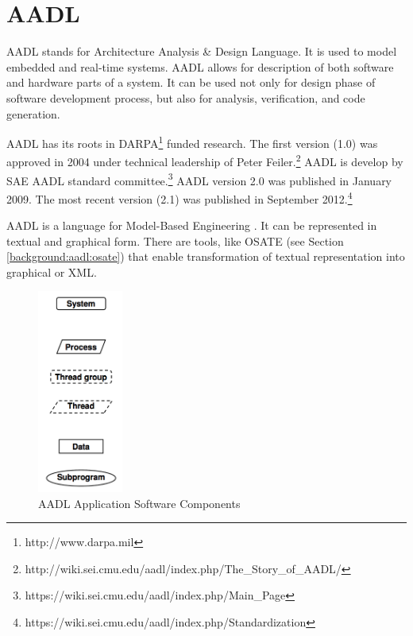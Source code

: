 \section{AADL}
\label{background:aadl}

AADL stands for Architecture Analysis \& Design Language. It is used to model embedded and real-time systems. AADL allows for description of both software and hardware parts of a system. It can be used not only for design phase of software development process, but also for analysis, verification, and code generation.

AADL has its roots in DARPA\footnote{http://www.darpa.mil} funded research. The first version (1.0) was approved in 2004 under technical leadership of Peter Feiler.\footnote{http://wiki.sei.cmu.edu/aadl/index.php/The\_Story\_of\_AADL/} AADL is develop by SAE AADL standard committee.\footnote{https://wiki.sei.cmu.edu/aadl/index.php/Main\_Page} AADL version 2.0 was published in January 2009. The most recent version (2.1) was published in September 2012.\footnote{https://wiki.sei.cmu.edu/aadl/index.php/Standardization}

AADL is a language for Model-Based Engineering \cite{AadlBook}. It can be represented in textual and graphical form. There are tools, like OSATE (see Section \ref{background:aadl:osate}) that enable transformation of textual representation into graphical or XML. 

\begin{figure}
  \begin{center}
    \includegraphics[width=0.25\textwidth]{figures/aadl-app-components.png}
  \end{center}
  \caption{AADL Application Software Components}
  \label{figure:aadl_app_software_components}
\end{figure}


